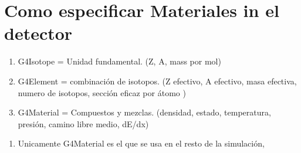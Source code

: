 \documentclass[10pt,a4paper,oneside]{book}
\begin{document}
\section*{Como especificar Materiales in el detector}
\begin{enumerate}
\item G4Isotope = Unidad fundamental. (Z, A, mass por mol)
\item G4Element = combinación de isotopos. (Z efectivo, A efectivo,
  masa efectiva, numero de isotopos, sección eficaz por átomo )
\item G4Material = Compuestos y mezclas. (densidad, estado, temperatura, presión, camino libre medio, dE/dx)
\end{enumerate}
\begin{enumerate}
\item Unicamente G4Material es el que se usa en el resto de la simulación, 
\end{enumerate}
\end{document}
